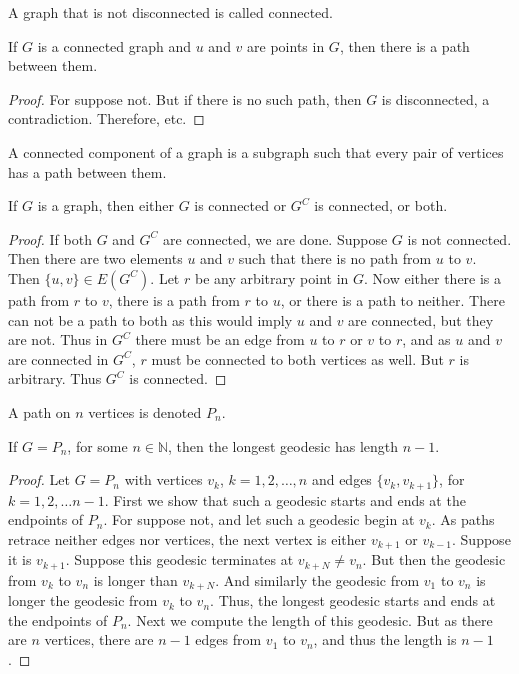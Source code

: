 \documentclass[crop=false,class=book,oneside]{standalone}
\begin{document}
\begin{definition}
A graph that is not disconnected is called connected.
\end{definition}
\begin{corollary}
If $G$ is a connected graph and $u$ and $v$ are points in $G$, then there is a path between them.
\end{corollary}
\begin{proof}
For suppose not. But if there is no such path, then $G$ is disconnected, a contradiction. Therefore, etc.
\end{proof}
\begin{definition}
A connected component of a graph is a subgraph such that every pair of vertices has a path between them.
\end{definition}
\begin{theorem}
If $G$ is a graph, then either $G$ is connected or $G^C$ is connected, or both. 
\end{theorem}
\begin{proof}
If both $G$ and $G^C$ are connected, we are done. Suppose $G$ is not connected. Then there are two elements $u$ and $v$ such that there is no path from $u$ to $v$. Then $\{u,v\}\in E(G^C)$. Let $r$ be any arbitrary point in $G$. Now either there is a path from $r$ to $v$, there is a path from $r$ to $u$, or there is a path to neither. There can not be a path to both as this would imply $u$ and $v$ are connected, but they are not. Thus in $G^C$ there must be an edge from $u$ to $r$ or $v$ to $r$, and as $u$ and $v$ are connected in $G^C$, $r$ must be connected to both vertices as well. But $r$ is arbitrary. Thus $G^C$ is connected.
\end{proof}
\begin{definition}
A path on $n$ vertices is denoted $P_n$.
\end{definition}
\begin{corollary}
If $G = P_n$, for some $n\in \mathbb{N}$, then the longest geodesic has length $n-1$.
\end{corollary}
\begin{proof}
Let $G=P_n$ with vertices $v_k$, $k=1,2,\hdots, n$ and edges $\{v_k,v_{k+1}\}$, for $k=1,2,\hdots n-1$. First we show that such a geodesic starts and ends at the endpoints of $P_n$. For suppose not, and let such a geodesic begin at $v_k$. As paths retrace neither edges nor vertices, the next vertex is either $v_{k+1}$ or $v_{k-1}$. Suppose it is $v_{k+1}$. Suppose this geodesic terminates at $v_{k+N} \ne v_{n}$. But then the geodesic from $v_{k}$ to $v_{n}$ is longer than $v_{k+N}$. And similarly the geodesic from $v_1$ to $v_n$ is longer the geodesic from $v_k$ to $v_n$. Thus, the longest geodesic starts and ends at the endpoints of $P_n$. Next we compute the length of this geodesic. But as there are $n$ vertices, there are $n-1$ edges from $v_1$ to $v_n$, and thus the length is $n-1$.
\end{proof}
\end{document}
